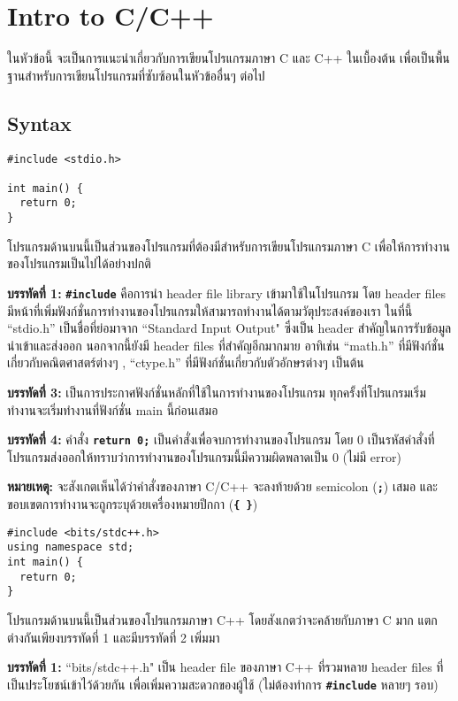 \chapter{Intro to C/C++}
ในหัวข้อนี้ จะเป็นการแนะนำเกี่ยวกับการเขียนโปรแกรมภาษา C และ C++ ในเบื้องต้น เพื่อเป็นพื้นฐานสำหรับการเขียนโปรแกรมที่ซับซ้อนในหัวข้ออื่นๆ ต่อไป
\section{Syntax}
\begin{lstlisting}
#include <stdio.h>

int main() {
  return 0;
}
\end{lstlisting}
โปรแกรมด้านบนนี้เป็นส่วนของโปรแกรมที่ต้องมีสำหรับการเขียนโปรแกรมภาษา C เพื่อให้การทำงานของโปรแกรมเป็นไปได้อย่างปกติ

\textbf{บรรทัดที่ 1:} \textbf{\texttt{\#include}} คือการนำ header file library  เข้ามาใช้ในโปรแกรม โดย header files มีหน้าที่เพิ่มฟังก์ชั่นการทำงานของโปรแกรมให้สามารถทำงานได้ตามวัตุประสงค์ของเรา ในที่นี้ ``stdio.h'' เป็นชื่อที่ย่อมาจาก ``Standard Input Output" ซึ่งเป็น header สำคัญในการรับข้อมูลนำเข้าและส่งออก นอกจากนี้ยังมี header files ที่สำคัญอีกมากมาย อาทิเช่น ``math.h'' ที่มีฟังก์ชั่นเกี่ยวกับคณิตศาสตร์ต่างๆ , ``ctype.h'' ที่มีฟังก์ชั่นเกี่ยวกับตัวอักษรต่างๆ เป็นต้น

\textbf{บรรทัดที่ 3:} เป็นการประกาศฟังก์ชั่นหลักที่ใช้ในการทำงานของโปรแกรม ทุกครั้งที่โปรแกรมเริ่มทำงานจะเริ่มทำงานที่ฟังก์ชั่น main นี้ก่อนเสมอ

\textbf{บรรทัดที่ 4:} คำสั่ง \textbf{\texttt{return 0;}} เป็นคำสั่งเพื่อจบการทำงานของโปรแกรม โดย 0 เป็นรหัสคำสั่งที่โปรแกรมส่งออกให้ทราบว่าการทำงานของโปรแกรมนี้มีความผิดพลาดเป็น 0 (ไม่มี error)

\noindent\textbf{หมายเหตุ:} จะสังเกตเห็นได้ว่าคำสั่งของภาษา C/C++ จะลงท้ายด้วย semicolon (\textbf{\texttt{;}}) เสมอ และขอบเขตการทำงานจะถูกระบุด้วยเครื่องหมายปีกกา (\textbf{\texttt{\{ \}}})

\newpage
\begin{lstlisting}
#include <bits/stdc++.h>
using namespace std;
int main() {
  return 0;
}
\end{lstlisting}
โปรแกรมด้านบนนี้เป็นส่วนของโปรแกรมภาษา C++ โดยสังเกตว่าจะคล้ายกับภาษา C มาก แตกต่างกันเพียงบรรทัดที่ 1 และมีบรรทัดที่ 2 เพิ่มมา

\textbf{บรรทัดที่ 1:} ``bits/stdc++.h" เป็น header file ของภาษา C++ ที่รวมหลาย header files ที่เป็นประโยชน์เข้าไว้ด้วยกัน เพื่อเพิ่มความสะดวกของผู้ใช้ (ไม่ต้องทำการ \textbf{\texttt{\#include}} หลายๆ รอบ)

